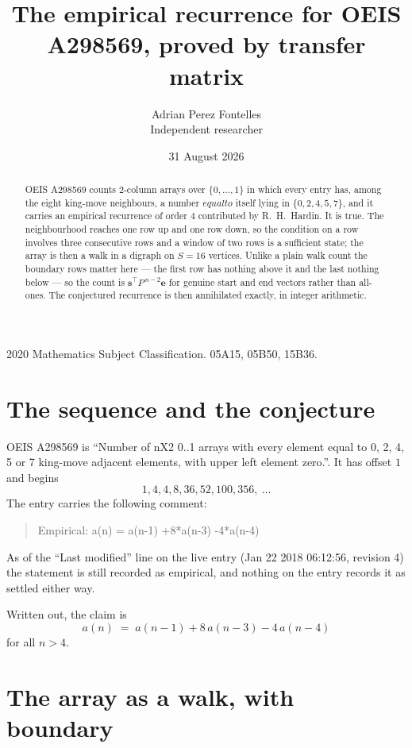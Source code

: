 \documentclass[11pt,a4paper]{article}
\title{The empirical recurrence for OEIS A298569, proved by transfer matrix}
\author{Adrian Perez Fontelles\\ \small Independent researcher}
\date{31 August 2026}
\theoremstyle{plain}
\theoremstyle{definition}
\begin{document}
\maketitle

\begin{abstract}
OEIS A298569 counts $2$-column arrays over $\{0,\dots,1\}$ in which every entry has,
among the eight king-move neighbours, a number $equal to$ itself lying in $\{0,2,4,5,7\}$, and it carries an empirical
recurrence of order $4$ contributed by R.~H.~Hardin. It is true. The neighbourhood
reaches one row up and one row down, so the condition on a row involves three consecutive
rows and a window of two rows is a sufficient state; the array is then a walk in a digraph
on $S=16$ vertices. Unlike a plain walk count the boundary rows matter here --- the first
row has nothing above it and the last nothing below --- so the count is
$\mathbf{s}^{\!\top}P^{\,n-2}\mathbf{e}$ for genuine start and end vectors rather than
all-ones. The conjectured recurrence is then annihilated exactly, in integer arithmetic.
\end{abstract}

\noindent\small 2020 Mathematics Subject Classification. 05A15, 05B50, 15B36.\normalsize

\section{The sequence and the conjecture}

OEIS A298569 is ``Number of nX2 0..1 arrays with every element equal to 0, 2, 4, 5 or 7 king-move adjacent elements, with upper left element zero.''. It has offset
$1$ and begins
\[
1, 4, 4, 8, 36, 52, 100, 356,\ \dots
\]
The entry carries the following comment:
\begin{quote}\small
Empirical: a(n) = a(n-1) +8*a(n-3) -4*a(n-4)
\end{quote}
As of the ``Last modified'' line on the live entry (Jan 22 2018 06:12:56, revision
4) the statement is still recorded as empirical, and nothing on the entry
records it as settled either way.

Written out, the claim is
\begin{equation}\label{eq:conj}
a(n)\;=\;a(n-1) + 8\,a(n-3) - 4\,a(n-4)
\end{equation}
for all $n>4$.

\section{The array as a walk, with boundary}
\end{document}
